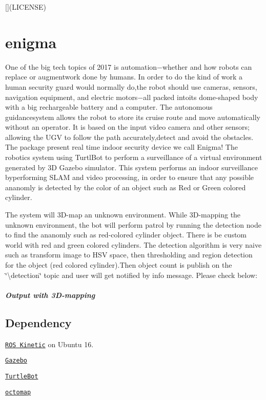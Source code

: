 \href{https://travis-ci.org/raviBhadeshiya/enigma}{\tt } \mbox{[}\mbox{]}(L\+I\+C\+E\+N\+SE) \section*{enigma}

One of the big tech topics of 2017 is automation−whether and how robots can replace or augmentwork done by humans. In order to do the kind of work a human security guard would normally do,the robot should use cameras, sensors, navigation equipment, and electric motors−all packed intoits dome-\/shaped body with a big rechargeable battery and a computer. The autonomous guidancesystem allows the robot to store its cruise route and move automatically without an operator. It is based on the input video camera and other sensors; allowing the U\+GV to follow the path accurately,detect and avoid the obstacles. The package present real time indoor security device we call Enigma! The robotics system using Turtl\+Bot to perform a surveillance of a virtual environment generated by 3D Gazebo simulator. This system performs an indoor surveillance byperforming S\+L\+AM and video processing, in order to ensure that any possible ananomly is detected by the color of an object such as Red or Green colored cylinder.

The system will 3\+D-\/map an unknown environment. While 3\+D-\/mapping the unknown environment, the bot will perform patrol by running the detection node to find the ananomly such as red-\/colored cylinder object. There is be custom world with red and green colored cylinders. The detection algorithm is very naive such as transform image to H\+SV space, then thresholding and region detection for the object (red colored cylinder).Then object count is publish on the \char`\"{}\textbackslash{}detection\char`\"{} topic and user will get notified by info message. Please check below\+:



\subparagraph*{Output with 3\+D-\/mapping}



\subsection*{Dependency}


\begin{DoxyItemize}
\item \href{http://wiki.ros.org/ROS/Installation}{\tt R\+OS Kinetic} on Ubuntu 16.
\item \href{http://gazebosim.org/}{\tt Gazebo}
\item \href{http://wiki.ros.org/Robots/TurtleBot}{\tt Turtle\+Bot}
\item \href{http://wiki.ros.org/octomap}{\tt octomap}
\end{DoxyItemize}

